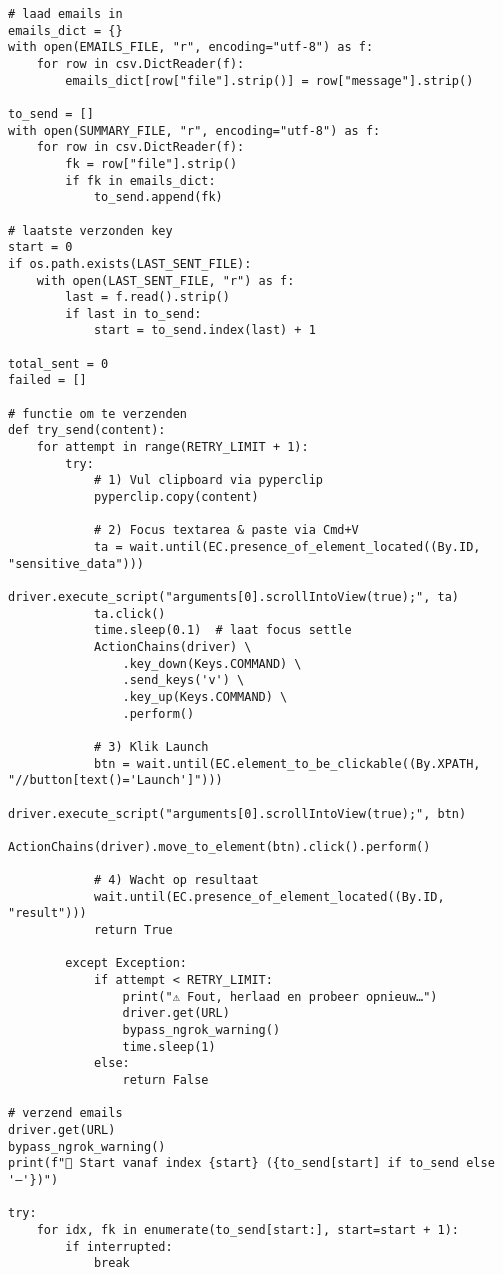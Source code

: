 \begin{lstlisting}[style=custompython,caption={Selenium WebDriver script voor automatisering van gegevensverwerking variabelen},label={lst:send-request}, captionpos=b]
# laad emails in
emails_dict = {}
with open(EMAILS_FILE, "r", encoding="utf-8") as f:
    for row in csv.DictReader(f):
        emails_dict[row["file"].strip()] = row["message"].strip()

to_send = []
with open(SUMMARY_FILE, "r", encoding="utf-8") as f:
    for row in csv.DictReader(f):
        fk = row["file"].strip()
        if fk in emails_dict:
            to_send.append(fk)

# laatste verzonden key
start = 0
if os.path.exists(LAST_SENT_FILE):
    with open(LAST_SENT_FILE, "r") as f:
        last = f.read().strip()
        if last in to_send:
            start = to_send.index(last) + 1

total_sent = 0
failed = []

# functie om te verzenden
def try_send(content):
    for attempt in range(RETRY_LIMIT + 1):
        try:
            # 1) Vul clipboard via pyperclip
            pyperclip.copy(content)

            # 2) Focus textarea & paste via Cmd+V
            ta = wait.until(EC.presence_of_element_located((By.ID, "sensitive_data")))
            driver.execute_script("arguments[0].scrollIntoView(true);", ta)
            ta.click()
            time.sleep(0.1)  # laat focus settle
            ActionChains(driver) \
                .key_down(Keys.COMMAND) \
                .send_keys('v') \
                .key_up(Keys.COMMAND) \
                .perform()

            # 3) Klik Launch
            btn = wait.until(EC.element_to_be_clickable((By.XPATH, "//button[text()='Launch']")))
            driver.execute_script("arguments[0].scrollIntoView(true);", btn)
            ActionChains(driver).move_to_element(btn).click().perform()

            # 4) Wacht op resultaat
            wait.until(EC.presence_of_element_located((By.ID, "result")))
            return True

        except Exception:
            if attempt < RETRY_LIMIT:
                print("⚠️ Fout, herlaad en probeer opnieuw…")
                driver.get(URL)
                bypass_ngrok_warning()
                time.sleep(1)
            else:
                return False

# verzend emails
driver.get(URL)
bypass_ngrok_warning()
print(f"🚀 Start vanaf index {start} ({to_send[start] if to_send else '–'})")

try:
    for idx, fk in enumerate(to_send[start:], start=start + 1):
        if interrupted:
            break


\end{lstlisting}

